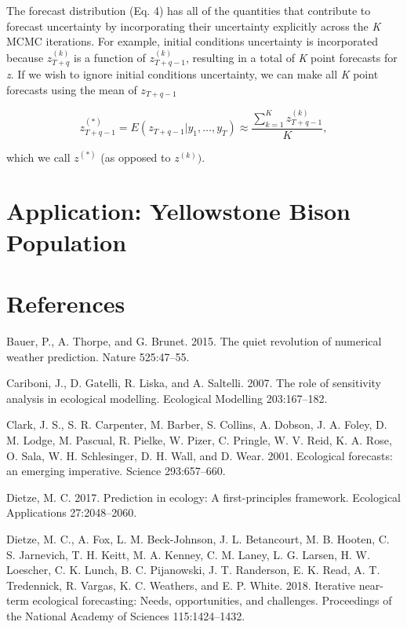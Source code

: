 \documentclass[12pt,]{article}
\begin{document}
The forecast distribution (Eq. 4) has all of the quantities that
contribute to forecast uncertainty by incorporating their uncertainty
explicitly across the \emph{K} MCMC iterations. For example, initial
conditions uncertainty is incorporated because \(z_{T+q}^{(k)}\) is a
function of \(z_{T+q-1}^{(k)}\), resulting in a total of \emph{K} point
forecasts for \emph{z}. If we wish to ignore initial conditions
uncertainty, we can make all \emph{K} point forecasts using the mean of
\(z_{T+q-1}\)

\begin{equation}
z_{T+q-1}^{(*)} = E(z_{T+q-1} | y_1,\dots,y_T) \approx \frac{\sum^K_{k=1} z_{T+q-1}^{(k)}}{K},
\end{equation}

which we call \(z^{(*)}\) (as opposed to \(z^{(k)})\).

\section{Application: Yellowstone Bison
Population}\label{application-yellowstone-bison-population}

\section*{References}\label{references}

\hypertarget{refs}{}
\hypertarget{ref-Bauer2015}{}
Bauer, P., A. Thorpe, and G. Brunet. 2015. The quiet revolution of
numerical weather prediction. Nature 525:47--55.

\hypertarget{ref-Cariboni2007}{}
Cariboni, J., D. Gatelli, R. Liska, and A. Saltelli. 2007. The role of
sensitivity analysis in ecological modelling. Ecological Modelling
203:167--182.

\hypertarget{ref-Clark2001}{}
Clark, J. S., S. R. Carpenter, M. Barber, S. Collins, A. Dobson, J. A.
Foley, D. M. Lodge, M. Pascual, R. Pielke, W. Pizer, C. Pringle, W. V.
Reid, K. A. Rose, O. Sala, W. H. Schlesinger, D. H. Wall, and D. Wear.
2001. Ecological forecasts: an emerging imperative. Science
293:657--660.

\hypertarget{ref-Dietze2017a}{}
Dietze, M. C. 2017. Prediction in ecology: A first-principles framework.
Ecological Applications 27:2048--2060.

\hypertarget{ref-Dietze2018}{}
Dietze, M. C., A. Fox, L. M. Beck-Johnson, J. L. Betancourt, M. B.
Hooten, C. S. Jarnevich, T. H. Keitt, M. A. Kenney, C. M. Laney, L. G.
Larsen, H. W. Loescher, C. K. Lunch, B. C. Pijanowski, J. T. Randerson,
E. K. Read, A. T. Tredennick, R. Vargas, K. C. Weathers, and E. P.
White. 2018. Iterative near-term ecological forecasting: Needs,
opportunities, and challenges. Proceedings of the National Academy of
Sciences 115:1424--1432.
\end{document}
